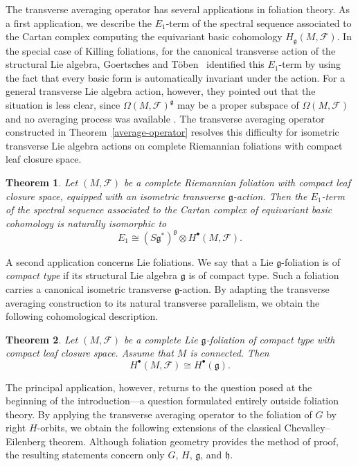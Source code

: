 \documentclass[reqno, 11pt]{amsart}
\newtheorem{thm}{Theorem}[section]
\theoremstyle{definition}
\theoremstyle{property}
\theoremstyle{remark}
\numberwithin{equation}{section}
\begin{document}
The transverse averaging operator has several applications in foliation
theory. As a first application, we describe the $E_1$-term of the spectral
sequence associated to the Cartan complex computing the equivariant basic
cohomology $H_{\mathfrak g}(M,\mathcal F)$. In the special case of Killing
foliations, for the canonical transverse action of the structural Lie
algebra, Goertsches and T\"oben~\cite[Thm.~3.23]{GT10} identified this
$E_1$-term by using the fact that every basic form is automatically invariant
under the action. For a general transverse Lie algebra action, however, they
pointed out that the situation is less clear, since
$\Omega(M,\mathcal F)^{\mathfrak g}$ may be a proper subspace of
$\Omega(M,\mathcal F)$ and no averaging process was available
\cite[Sec.~3.6]{GT10}. The transverse averaging operator constructed in
Theorem~\ref{average-operator} resolves this difficulty for isometric
transverse Lie algebra actions on complete Riemannian foliations with compact
leaf closure space.

\begin{thm}\label{thm:E1}
Let $(M,\mathcal F)$ be a complete Riemannian foliation with compact leaf
closure space, equipped with an isometric transverse $\mathfrak g$-action.
Then the $E_1$-term of the spectral sequence associated to the Cartan complex
of equivariant basic cohomology is naturally isomorphic to
\[
E_1 \cong (S\mathfrak{g}^*)^{\mathfrak{g}} \otimes H^\bullet(M,\mathcal{F}).
\]
\end{thm}

A second application concerns Lie foliations. We say that a Lie
$\mathfrak g$-foliation is of \emph{compact type} if its structural Lie
algebra $\mathfrak g$ is of compact type. Such a foliation carries a
canonical isometric transverse $\mathfrak g$-action. By adapting the
transverse averaging construction to its natural transverse parallelism, we
obtain the following cohomological description.

\begin{thm}\label{thm:liefoliation}
Let $(M,\mathcal{F})$ be a complete Lie $\mathfrak{g}$-foliation of compact type with compact leaf closure space. Assume that $M$ is connected. Then
\[
H^\bullet(M,\mathcal{F}) \cong H^\bullet(\mathfrak{g}).
\]
\end{thm}

The principal application, however, returns to the question posed at the
beginning of the introduction---a question formulated entirely outside
foliation theory. By applying the transverse averaging operator to the
foliation of $G$ by right $H$-orbits, we obtain the following extensions of
the classical Chevalley--Eilenberg theorem. Although foliation geometry
provides the method of proof, the resulting statements concern only $G$, $H$,
$\mathfrak g$, and $\mathfrak h$.
\end{document}
